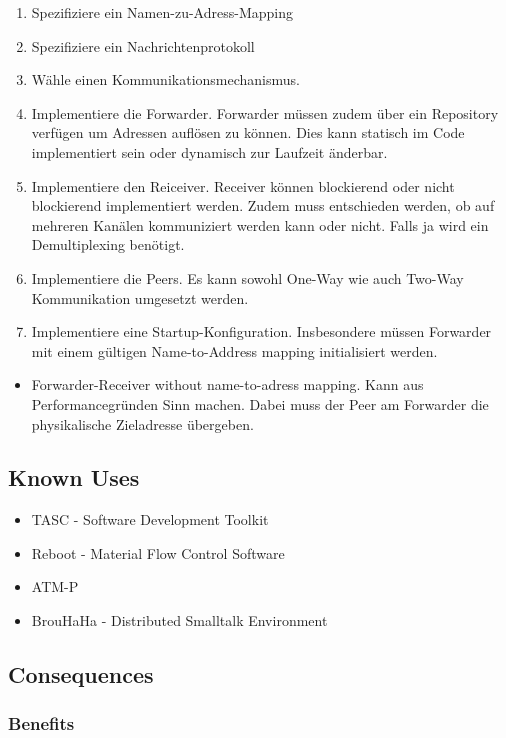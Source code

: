 \begin{enumerate}
	\item Spezifiziere ein Namen-zu-Adress-Mapping
	\item Spezifiziere ein Nachrichtenprotokoll
	\item Wähle einen Kommunikationsmechanismus.
	\item Implementiere die Forwarder. Forwarder müssen zudem über ein Repository verfügen um Adressen auflösen zu können. Dies kann statisch im Code implementiert sein oder dynamisch zur Laufzeit änderbar.
	\item Implementiere den Reiceiver. Receiver können blockierend oder nicht blockierend implementiert werden. Zudem muss entschieden werden, ob auf mehreren Kanälen kommuniziert werden kann oder nicht. Falls ja wird ein Demultiplexing benötigt.
	\item Implementiere die Peers. Es kann sowohl One-Way wie auch Two-Way Kommunikation umgesetzt werden.
	\item Implementiere eine Startup-Konfiguration. Insbesondere müssen Forwarder mit einem gültigen Name-to-Address mapping initialisiert werden.
\end{enumerate}


\begin{itemize}
	\item Forwarder-Receiver without name-to-adress mapping. Kann aus Performancegründen Sinn machen. Dabei muss der Peer am Forwarder die physikalische Zieladresse übergeben.
\end{itemize}

\subsection*{Known Uses}


\begin{itemize}
	\item TASC - Software Development Toolkit
	\item Reboot - Material Flow Control Software
	\item ATM-P
	\item BrouHaHa - Distributed Smalltalk Environment
\end{itemize}

\subsection*{Consequences}


\subsubsection*{Benefits}


